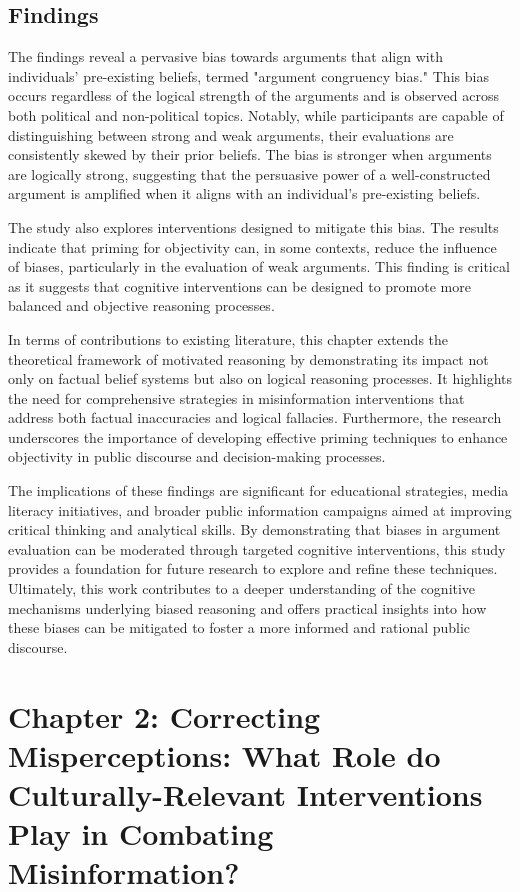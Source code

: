 \documentclass[12pt]{article}[1in]
\begin{document}
\subsection*{Findings}

The findings reveal a pervasive bias towards arguments that align with individuals' pre-existing beliefs, termed "argument congruency bias." This bias occurs regardless of the logical strength of the arguments and is observed across both political and non-political topics. Notably, while participants are capable of distinguishing between strong and weak arguments, their evaluations are consistently skewed by their prior beliefs. The bias is stronger when arguments are logically strong, suggesting that the persuasive power of a well-constructed argument is amplified when it aligns with an individual's pre-existing beliefs.

The study also explores interventions designed to mitigate this bias. The results indicate that priming for objectivity can, in some contexts, reduce the influence of biases, particularly in the evaluation of weak arguments. This finding is critical as it suggests that cognitive interventions can be designed to promote more balanced and objective reasoning processes.

In terms of contributions to existing literature, this chapter extends the theoretical framework of motivated reasoning by demonstrating its impact not only on factual belief systems but also on logical reasoning processes. It highlights the need for comprehensive strategies in misinformation interventions that address both factual inaccuracies and logical fallacies. Furthermore, the research underscores the importance of developing effective priming techniques to enhance objectivity in public discourse and decision-making processes.

The implications of these findings are significant for educational strategies, media literacy initiatives, and broader public information campaigns aimed at improving critical thinking and analytical skills. By demonstrating that biases in argument evaluation can be moderated through targeted cognitive interventions, this study provides a foundation for future research to explore and refine these techniques. Ultimately, this work contributes to a deeper understanding of the cognitive mechanisms underlying biased reasoning and offers practical insights into how these biases can be mitigated to foster a more informed and rational public discourse.

\section*{Chapter 2: Correcting Misperceptions: What Role do Culturally-Relevant Interventions Play in Combating Misinformation?}
\end{document}
